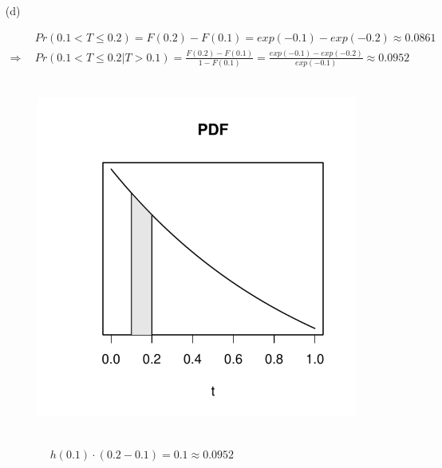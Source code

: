 \documentclass[paper=a4, fontsize=11pt]{scrartcl} %
\numberwithin{equation}{section} %
\numberwithin{figure}{section} %
\numberwithin{table}{section} %
\begin{document}
\begin{itemize}
	\item[(d)]{
		\begin{align*}
						&	Pr(0.1 < T \leq 0.2) = F(0.2) - F(0.1) = exp(-0.1) - exp(-0.2) \approx 0.0861\\
			\Rightarrow\ \ 	&	Pr(0.1 < T \leq 0.2 \vert T>0.1) = \frac{F(0.2) - F(0.1) }{1 - F(0.1) } 
							= \frac{ exp(-0.1) - exp(-0.2)}{ exp(-0.1)} \approx  0.0952
		\end{align*}	
		\	
		\begin{figure}[h]
			\centering
			\includegraphics[width = 2.3 in]{2_5_d.pdf}
		\end{figure}
			\\ $\qquad \ \ \ \ \ \ \ \ \  h(0.1) \cdot (0.2-0.1) = 0.1 \approx 0.0952$
	}
\end{itemize}
\end{document}
